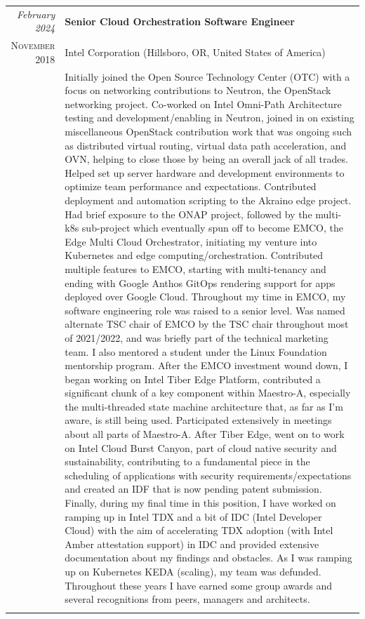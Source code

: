 \documentclass[letter,10pt]{article} %
\begin{document}
\begin{tabular}{r|p{13.4cm}}
	\emph{February 2024} & \textbf{Senior Cloud Orchestration Software Engineer}\\
	\textsc{November 2018} & Intel Corporation (Hillsboro, OR, United States of America) \\
	& \scriptsize{Initially joined the Open Source Technology Center (OTC) with a focus on networking contributions to Neutron, the OpenStack networking project. Co-worked on Intel Omni-Path Architecture} testing and development/enabling in Neutron, joined in on existing miscellaneous OpenStack contribution work that was ongoing such as distributed virtual routing, virtual data path acceleration, and OVN, helping to close those by being an overall jack of all trades. Helped set up server hardware and development environments to optimize team performance and expectations. Contributed deployment and automation scripting to the Akraino edge project. Had brief exposure to the ONAP project, followed by the multi-k8s sub-project which eventually spun off to become EMCO, the Edge Multi Cloud Orchestrator, initiating my venture into Kubernetes and edge computing/orchestration. Contributed multiple features to EMCO, starting with multi-tenancy and ending with Google Anthos GitOps rendering support for apps deployed over Google Cloud. Throughout my time in EMCO, my software engineering role was raised to a senior level. Was named alternate TSC chair of EMCO by the TSC chair throughout most of 2021/2022, and was briefly part of the technical marketing team. I also mentored a student under the Linux Foundation mentorship program. After the EMCO investment wound down, I began working on Intel Tiber Edge Platform, contributed a significant chunk of a key component within Maestro-A, especially the multi-threaded state machine architecture that, as far as I'm aware, is still being used. Participated extensively in meetings about all parts of Maestro-A. After Tiber Edge, went on to work on Intel Cloud Burst Canyon, part of cloud native security and sustainability, contributing to a fundamental piece in the scheduling of applications with security requirements/expectations and created an IDF that is now pending patent submission. Finally, during my final time in this position, I have worked on ramping up in Intel TDX and a bit of IDC (Intel Developer Cloud) with the aim of accelerating TDX adoption (with Intel Amber attestation support) in IDC and provided extensive documentation about my findings and obstacles. As I was ramping up on Kubernetes KEDA (scaling), my team was defunded. Throughout these years I have earned some group awards and several recognitions from peers, managers and architects.\\
	\multicolumn{2}{c}{} \\


\end{tabular}
\end{document}

